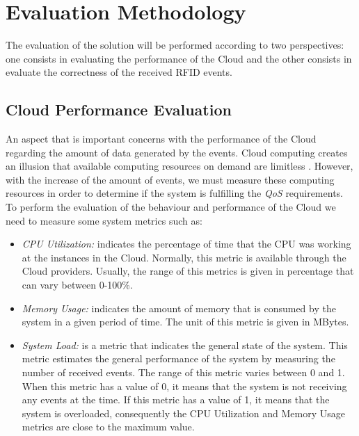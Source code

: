 \section{Evaluation Methodology}
\label{sec:evaluation}
The evaluation of the solution will be performed according to two perspectives: one consists in
evaluating the performance of the Cloud and the other consists in evaluate the correctness of
the received RFID events.

\subsection{Cloud Performance Evaluation}
\label{subs:cloud_performance_evaluation}
An aspect that is important concerns with the performance of the Cloud regarding the amount
of data generated by the events. Cloud computing creates an illusion that available computing
resources on demand are limitless \cite{armbrust2009m}. However, with the increase of the amount of
events, we must measure these computing resources in order to determine if the system is fulfilling
the \textit{QoS} requirements. To perform the evaluation of the behaviour and performance of the Cloud
we need to measure some system metrics such as:
\begin{itemize}
  \item \textit{CPU Utilization:} indicates the percentage of time that the CPU was working at
  the instances in the Cloud. Normally, this metric is available through the Cloud providers.
  Usually, the range of this metrics is given in percentage that can vary between 0-100\%.
  \item \textit{Memory Usage:} indicates the amount of memory that is consumed by the system in a
  given period of time. The unit of this metric is given in MBytes.
  \item \textit{System Load:} is a metric that indicates the general state of the system.
  This metric estimates the general performance of the system by measuring the number of received events.
  The range of this metric varies between 0 and 1. When this metric has a value of 0, it means that the
  system is not receiving any events at the time. If this metric has a value of 1, it means that the system
  is overloaded, consequently the CPU Utilization and Memory Usage metrics are close to the maximum value.
\end{itemize}

